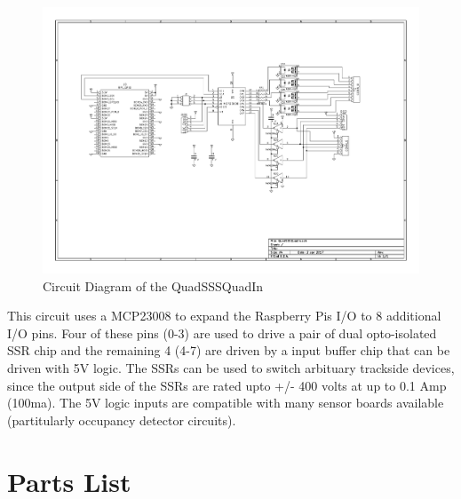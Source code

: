 \begin{figure}[hbpt]\begin{centering}%
\includegraphics[width=5in]{QuadSSSQuadIn.pdf}
\caption{Circuit Diagram of the QuadSSSQuadIn}
\end{centering}\end{figure}
This circuit uses a MCP23008 to expand the Raspberry Pis I/O to 8 additional 
I/O pins.  Four of these pins (0-3) are used to drive a pair of dual 
opto-isolated SSR chip and the remaining 4 (4-7) are driven by a input buffer 
chip that can be driven with 5V logic.  The SSRs can be used to switch 
arbituary trackside devices, since the output side of the SSRs are rated upto 
+/- 400 volts at up to 0.1 Amp (100ma).  The 5V logic inputs are compatible 
with many sensor boards available (partitularly occupancy detector circuits).

\section{Parts List}

